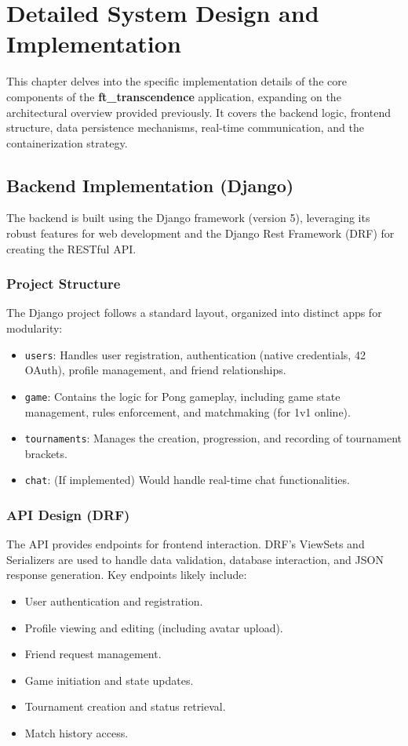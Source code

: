 
\chapter{Detailed System Design and Implementation}
\label{ch:implementation}

This chapter delves into the specific implementation details of the core components of the \textbf{ft\_transcendence} application, expanding on the architectural overview provided previously. It covers the backend logic, frontend structure, data persistence mechanisms, real-time communication, and the containerization strategy.

\section{Backend Implementation (Django)}
\label{sec:backend_impl}
The backend is built using the Django framework (version 5), leveraging its robust features for web development and the Django Rest Framework (DRF) for creating the RESTful API.

\subsection{Project Structure}
The Django project follows a standard layout, organized into distinct apps for modularity:
\begin{itemize}
    \item \texttt{users}: Handles user registration, authentication (native credentials, 42 OAuth), profile management, and friend relationships.
    \item \texttt{game}: Contains the logic for Pong gameplay, including game state management, rules enforcement, and matchmaking (for 1v1 online).
    \item \texttt{tournaments}: Manages the creation, progression, and recording of tournament brackets.
    \item \texttt{chat}: (If implemented) Would handle real-time chat functionalities.
\end{itemize}

\subsection{API Design (DRF)}
The API provides endpoints for frontend interaction. DRF's ViewSets and Serializers are used to handle data validation, database interaction, and JSON response generation. Key endpoints likely include:
\begin{itemize}
    \item User authentication and registration.
    \item Profile viewing and editing (including avatar upload).
    \item Friend request management.
    \item Game initiation and state updates.
    \item Tournament creation and status retrieval.
    \item Match history access.
\end{itemize}

